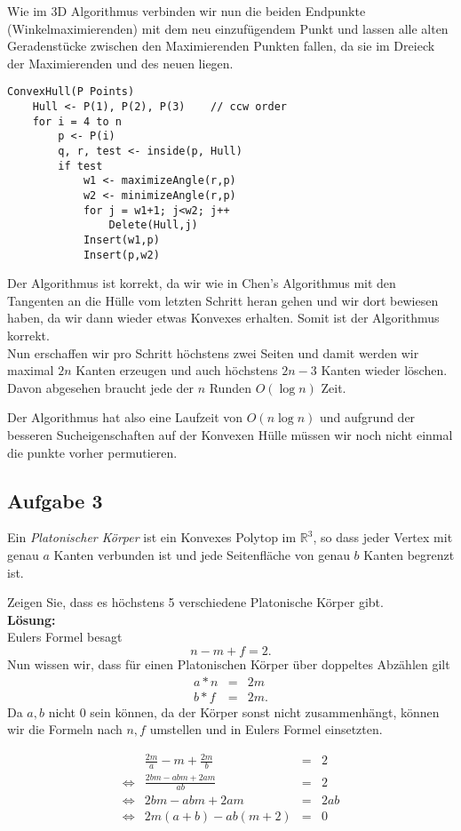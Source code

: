 \documentclass[11pt,a4paper,ngerman]{article}
\begin{document}
Wie im 3D Algorithmus verbinden wir nun die beiden Endpunkte (Winkelmaximierenden) mit dem neu einzufügendem Punkt und lassen alle alten Geradenstücke
zwischen den Maximierenden Punkten fallen, da sie im Dreieck der Maximierenden
und des neuen liegen.\\

\begin{lstlisting}[frame=single]
ConvexHull(P Points)
    Hull <- P(1), P(2), P(3)    // ccw order
    for i = 4 to n
        p <- P(i)
        q, r, test <- inside(p, Hull)
        if test
            w1 <- maximizeAngle(r,p)
            w2 <- minimizeAngle(r,p)
            for j = w1+1; j<w2; j++
                Delete(Hull,j)
            Insert(w1,p)
            Insert(p,w2)
\end{lstlisting}

Der Algorithmus ist korrekt, da wir wie in Chen's Algorithmus mit
den Tangenten an die Hülle vom letzten Schritt heran gehen und wir dort
bewiesen haben, da wir dann wieder etwas Konvexes erhalten. Somit ist
der Algorithmus korrekt.\\

Nun erschaffen wir pro Schritt höchstens zwei Seiten und damit
werden wir maximal $2n$ Kanten erzeugen und auch höchstens $2n-3$ Kanten
wieder löschen.
Davon abgesehen braucht jede der $n$ Runden $O(\log n)$ Zeit.

Der Algorithmus hat also eine Laufzeit von $O(n \log n)$ und aufgrund
der besseren Sucheigenschaften auf der Konvexen Hülle müssen wir noch nicht
einmal die punkte vorher permutieren.

\subsection*{Aufgabe 3}

Ein \emph{Platonischer Körper} ist ein Konvexes Polytop im $\mathbb{R}^3$, so
dass jeder Vertex mit genau $a$ Kanten verbunden ist und jede Seitenfläche
von genau $b$ Kanten begrenzt ist.

Zeigen Sie, dass es höchstens 5 verschiedene Platonische Körper gibt.\\

\textbf{Lösung:}\\

Eulers Formel besagt
$$
    n - m + f = 2.
$$
Nun wissen wir, dass für einen Platonischen Körper über doppeltes Abzählen
gilt
$$ \begin{array}{rcl}
    a*n &=& 2m\\
    b*f &=& 2m.    
\end{array}$$
Da $a,b$ nicht $0$ sein können, da der Körper sonst nicht zusammenhängt,
können wir die Formeln nach $n,f$ umstellen und in Eulers Formel einsetzten.

$$\begin{array}{lrcl}
    &\frac{2m}{a} - m + \frac{2m}{b} &=& 2\\
\Leftrightarrow &
    \frac{2bm -abm + 2am}{ab} &=& 2\\
\Leftrightarrow &
    2bm - abm + 2am &=& 2ab\\
\Leftrightarrow &
    2m( a + b ) - ab (m + 2) &=& 0
\end{array}$$
\label{LastPage}
\end{document}
